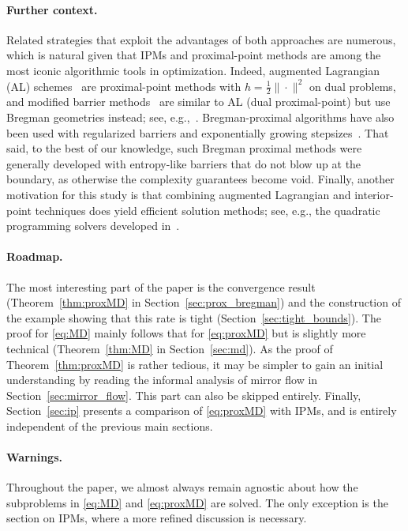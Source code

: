 \documentclass[a4paper]{article}
\begin{document}
\paragraph{Further context.}
Related strategies that exploit the advantages of both approaches are numerous, which is natural given that IPMs and proximal-point methods are among the most iconic algorithmic tools in optimization.
Indeed, augmented Lagrangian (AL) schemes~\cite{rockafellar1976augmented} are proximal-point methods with $h=\tfrac12\|\cdot\|^2$ on dual problems, and modified barrier methods~\cite{polyak1992modified} are similar to AL (dual proximal-point) but use Bregman geometries instead; see, e.g.,~\cite{teboulle1992entropic,eckstein1993nonlinear}.
Bregman-proximal algorithms have also been used with regularized barriers and exponentially growing stepsizes~\cite{tseng1993convergence,doljansky1998interior}.
That said, to the best of our knowledge, such Bregman proximal methods were generally developed with entropy-like barriers that do not blow up at the boundary, as otherwise the complexity guarantees become void.
Finally, another motivation for this study is that combining augmented Lagrangian and interior-point techniques does yield efficient solution methods; see, e.g., the quadratic programming solvers developed in~\cite{pougkakiotis2021interior,cipolla2023proximal}.

\paragraph{Roadmap.}
The most interesting part of the paper is the convergence result (Theorem~\ref{thm:proxMD} in Section~\ref{sec:prox_bregman}) and the construction of the example showing that this rate is tight (Section~\ref{sec:tight_bounds}).
The proof for \eqref{eq:MD} mainly follows that for \eqref{eq:proxMD} but is slightly more technical (Theorem~\ref{thm:MD} in Section~\ref{sec:md}).
As the proof of Theorem~\ref{thm:proxMD} is rather tedious, it may be simpler to gain an initial understanding by reading the informal analysis of mirror flow in Section~\ref{sec:mirror_flow}.
This part can also be skipped entirely.
Finally, Section~\ref{sec:ip} presents a comparison of \eqref{eq:proxMD} with IPMs, and is entirely independent of the previous main sections.

\paragraph{Warnings.}
Throughout the paper, we almost always remain agnostic about how the subproblems in \eqref{eq:MD} and \eqref{eq:proxMD} are solved.
The only exception is the section on IPMs, where a more refined discussion is necessary.
\end{document}
